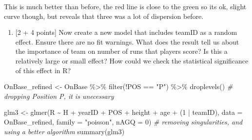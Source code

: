 \documentclass[
]{article}
\newenvironment{Shaded}{\begin{snugshade}}{\end{snugshade}}
\newcommand{\AttributeTok}[1]{\textcolor[rgb]{0.77,0.63,0.00}{#1}}
\newcommand{\CommentTok}[1]{\textcolor[rgb]{0.56,0.35,0.01}{\textit{#1}}}
\newcommand{\DecValTok}[1]{\textcolor[rgb]{0.00,0.00,0.81}{#1}}
\newcommand{\FunctionTok}[1]{\textcolor[rgb]{0.00,0.00,0.00}{#1}}
\newcommand{\NormalTok}[1]{#1}
\newcommand{\OtherTok}[1]{\textcolor[rgb]{0.56,0.35,0.01}{#1}}
\newcommand{\SpecialCharTok}[1]{\textcolor[rgb]{0.00,0.00,0.00}{#1}}
\newcommand{\StringTok}[1]{\textcolor[rgb]{0.31,0.60,0.02}{#1}}
\providecommand{\tightlist}{%
  \setlength{\itemsep}{0pt}\setlength{\parskip}{0pt}}
\begin{document}
This is much better than before, the red line is close to the green so
its ok, slight curve though, but reveals that three was a lot of
dispersion before.

\begin{enumerate}
\def\labelenumi{\alph{enumi}.}
\setcounter{enumi}{4}
\tightlist
\item
  {[}2 + 4 points{]} Now create a new model that includes teamID as a
  random effect. Ensure there are no fit warnings. What does the result
  tell us about the importance of team on number of runs that players
  score? Is this a relatively large or small effect? How could we check
  the statistical significance of this effect in R?
\end{enumerate}

\begin{Shaded}
\begin{Highlighting}[]
\NormalTok{OnBase\_refined }\OtherTok{\textless{}{-}}\NormalTok{ OnBase }\SpecialCharTok{\%\textgreater{}\%}
  \FunctionTok{filter}\NormalTok{(}\SpecialCharTok{!}\NormalTok{POS }\SpecialCharTok{==} \StringTok{"P"}\NormalTok{) }\SpecialCharTok{\%\textgreater{}\%}
  \FunctionTok{droplevels}\NormalTok{() }\CommentTok{\# dropping Position P, it is unecessary}
\end{Highlighting}
\end{Shaded}

\begin{Shaded}
\begin{Highlighting}[]
\NormalTok{glm3 }\OtherTok{\textless{}{-}} \FunctionTok{glmer}\NormalTok{(R }\SpecialCharTok{\textasciitilde{}}\NormalTok{ H }\SpecialCharTok{+}\NormalTok{ yearID }\SpecialCharTok{+}\NormalTok{ POS }\SpecialCharTok{+}\NormalTok{ height }\SpecialCharTok{+}\NormalTok{ age }\SpecialCharTok{+}\NormalTok{ (}\DecValTok{1} \SpecialCharTok{|}\NormalTok{ teamID), }\AttributeTok{data =}\NormalTok{ OnBase\_refined, }\AttributeTok{family =} \StringTok{"poisson"}\NormalTok{, }\AttributeTok{nAGQ =} \DecValTok{0}\NormalTok{) }\CommentTok{\# removing singularities, and using a better algorithm}
\FunctionTok{summary}\NormalTok{(glm3)}
\end{Highlighting}
\end{Shaded}
\end{document}

